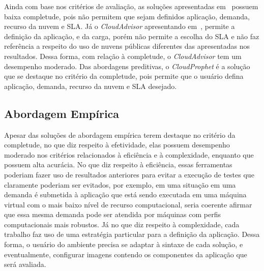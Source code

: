 Ainda com base nos critérios de avaliação, as soluções apresentadas
em~\cite{malkowski2010cloudxplor,cloudharmony} possuem baixa completude, pois
não permitem que sejam definidos aplicação, demanda, recurso da nuvem e SLA. Já
o \textit{CloudAdvisor} apresentando em~\cite{jung2013cloudadvisor}, permite a
definição da aplicação, e da carga, porém não permite a escolha do SLA e não
faz referência a respeito do uso de nuvens públicas diferentes das apresentadas
nos resultados. Dessa forma, com relação à completude, o \textit{CloudAdvisor}
tem um desempenho moderado. Das abordagens preditivas, o \textit{CloudProphet}
é a solução que se destaque no critério da completude, pois permite que o
usuário defina aplicação, demanda, recurso da nuvem e SLA desejado.

\subsection{Abordagem Empírica}
Apesar das soluções de abordagem empírica terem destaque no critério da completude, no que diz respeito à efetividade, elas possuem desempenho moderado nos critérios relacionados à eficiência e à complexidade, enquanto que possuem alta acurácia. No que diz respeito à eficiência, essas ferramentas poderiam fazer uso de resultados anteriores para evitar a execução de testes que claramente poderiam ser evitados, por exemplo, em uma situação em uma demanda é submetida à aplicação que está sendo executada em uma máquina virtual com o mais baixo nível de recurso computacional, seria coerente afirmar que essa mesma demanda pode ser atendida por máquinas com perfis computacionais mais robustos. Já no que diz respeito à complexidade, cada trabalho faz uso de uma estratégia particular para a definição da aplicação. Dessa forma, o usuário do ambiente precisa se adaptar à sintaxe de cada solução, e eventualmente, configurar imagens contendo os componentes da aplicação que será avaliada.









